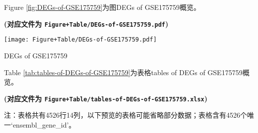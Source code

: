 \documentclass[
]{article}
\begin{document}
Figure \ref{fig:DEGs-of-GSE175759}为图DEGs of GSE175759概览。

\textbf{(对应文件为 \texttt{Figure+Table/DEGs-of-GSE175759.pdf})}

\def\@captype{figure}
\begin{center}
\texttt{[image: Figure+Table/DEGs-of-GSE175759.pdf]}
\caption{DEGs of GSE175759}\label{fig:DEGs-of-GSE175759}
\end{center}

Table \ref{tab:tables-of-DEGs-of-GSE175759}为表格tables of DEGs of GSE175759概览。

\textbf{(对应文件为 \texttt{Figure+Table/tables-of-DEGs-of-GSE175759.xlsx})}

\begin{center}\begin{tcolorbox}[colback=gray!10, colframe=gray!50, width=0.9\linewidth, arc=1mm, boxrule=0.5pt]注：表格共有4526行14列，以下预览的表格可能省略部分数据；表格含有4526个唯一`ensembl\_gene\_id'。
\end{tcolorbox}
\end{center}
\end{document}
